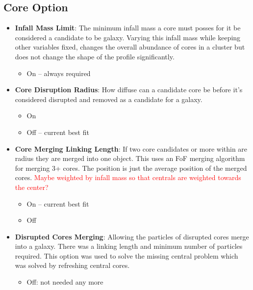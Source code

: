 \documentclass[twocolumn]{article}
\newcommand\mynotes[1]{\textcolor{red}{#1}}
\begin{document}

\subsection{Core Option}
\begin{itemize}
\item \textbf{Infall Mass Limit}: The minimum infall mass a core must posses
  for it be considered a candidate to be galaxy. Varying this infall
  mass while keeping other variables fixed, changes the overall
  abundance of cores in a cluster but does not change the shape of the
  profile significantly.
  \begin{itemize}
  \item On -- always required
  \end{itemize}

\item \textbf{Core Disruption Radius}: How diffuse can a candidate
  core be before it's considered disrupted and removed as a candidate
  for a galaxy.
  \begin{itemize}
  \item On
  \item Off -- current best fit
  \end{itemize}

\item \textbf{Core Merging Linking Length}: If two core candidates or
  more within are radius they are merged into one object. This uses an
  FoF merging algorithm for merging 3+ cores. The position is just the
  average position of the merged cores. \mynotes{Maybe weighted by
    infall mass so that centrals are weighted towards the center?}
  \begin{itemize}
  \item On -- current best fit
  \item Off 
  \end{itemize}
  

\item \textbf{Disrupted Cores Merging}: Allowing the particles of
  disrupted cores merge into a galaxy. There was a linking length and
  minimum number of particles required. This option was used to solve
  the missing central problem which was solved by refreshing central
  cores. 
  \begin{itemize}
  \item Off: not needed any more
  \end{itemize}


\end{itemize}
\end{document}
